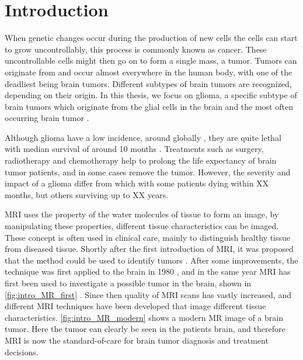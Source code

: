 
\chapter{Introduction}

When genetic changes occur during the production of new cells the cells can start to grow uncontrollably, this process is commonly known as cancer.
These uncontrollable cells might then go on to form a single mass, a tumor.
Tumors can originate from and occur almost everywhere in the human body, with one of the deadliest being brain tumors.
Different subtypes of brain tumors are recognized, depending on their origin.
In this thesis, we focus on glioma, a specific subtype of brain tumors which originate from the glial cells in the brain and the most often occurring brain tumor \autocite{leece2017indicence}.

Although glioma have a low incidence, around  globally \autocite{leece2017indicence}, they are quite lethal with median survival of around 10 months \autocite{hess2004gliomaincidence}.
Treatments such as surgery, radiotherapy and chemotherapy help to prolong the life expectancy of brain tumor patients, and in some cases remove the tumor.
However, the severity and impact of a glioma differ from which with some patients dying within XX months, but others surviving up to XX years.


\gls{MRI} uses the property of the water molecules of tissue to form an image, by manipulating these properties, different tissue characteristics can be imaged.
These concept is often used in clinical care, mainly to distinguish healthy tissue from diseased tissue.
Shortly after the first introduction of \gls{MRI}, it was proposed that the method could be used to identify tumors \autocite{damadian1971tumor}.
After some improvements, the technique was first applied to the brain in 1980 \autocite{holland1980brain}, and in the same year MRI has first been used to investigate a possible tumor in the brain, shown in \cref{fig:intro_MR_first} \autocite{hawkes1980NMRbrain}.
Since then quality of \gls{MRI} scans has vastly increased, and different \gls{MRI} techniques have been developed that image different tissue characteristics.
\cref{fig:intro_MR_modern} shows a modern \gls{MR} image of a brain tumor.
Here the tumor can clearly be seen in the patients brain, and therefore MRI is now the standard-of-care for brain tumor diagnosis and treatment decisions.

